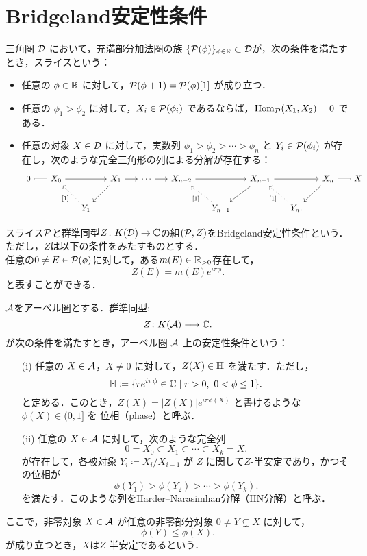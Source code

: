 \section{Bridgeland安定性条件}
\begin{defn}\cite{Bri07}
三角圏 $\D$ において，充満部分加法圏の族 $\{ \P(\phi) \}_{\phi \in \RR} \subset \D$が，次の条件を満たすとき，スライスという：
\begin{itemize}
  \item 任意の $\phi \in \RR$ に対して，$\P(\phi + 1) = \P(\phi)[1]$ が成り立つ．
  \item 任意の $\phi_1 > \phi_2$ に対して，$X_i \in \P(\phi_i)$ であるならば，$\Hom_{\D}(X_1, X_2) = 0$ である．
  \item 任意の対象 $X \in \D$ に対して，実数列 $\phi_1 > \phi_2 > \cdots > \phi_n$ と $Y_i \in \P(\phi_i)$ が存在し，次のような完全三角形の列による分解が存在する：
  \[
    \begin{tikzcd}[column sep=1.5em]
      0 \ar[r, equal] & X_0 \ar[rr] && X_1 \ar[r] \ar[ld] & \cdots \ar[r] & X_{n-2} \ar[rr] && X_{n-1} \ar[ld] \ar[rr] && X_n \ar[ld] \ar[r, equal] & X \\
      && Y_1 \ar[lu, dotted,swap, "{[1]}"'] &&&& Y_{n-1} \ar[lu, dotted,swap, "{[1]}"'] && Y_n \ar[lu, dotted,swap, "{[1]}"'].
    \end{tikzcd}
  \]
\end{itemize}
スライス$\P$と群準同型$Z\colon K(\D)\to \CC$の組$(\P,Z)$をBridgeland安定性条件という．ただし，$Z$は以下の条件をみたすものとする．\\
任意の$0\neq E\in\P(\phi)$に対して，ある$m(E)\in\RR_{>0}$存在して，
\[Z(E) = m(E)e^{i\pi\phi}.\]
と表すことができる．
\end{defn}


\begin{defn}\cite{Bri07}
$\A$をアーベル圏とする．群準同型:
\[
  Z \colon K(\A) \longrightarrow \CC.
\]
が次の条件を満たすとき，アーベル圏 $\A$ 上の安定性条件という：
\begin{itemize}
  \item[(i)] 任意の $X \in \A$，$X \neq 0$ に対して，$Z(X) \in \HH$ を満たす．ただし，
  \[
    \HH \coloneqq \{ re^{i\pi\phi} \in \CC \mid r > 0,\ 0 < \phi \le 1 \}.
  \]
  と定める．このとき，$Z(X) = |Z(X)|e^{i\pi\phi(X)}$ と書けるような $\phi(X) \in (0,1]$ を
  位相（phase）と呼ぶ．
  
  \item[(ii)] 任意の $X \in \A$ に対して，次のような完全列
  \[
    0 = X_0 \subset X_1 \subset \cdots \subset X_k = X.
  \]
  が存在して，各被対象 $Y_i \coloneqq X_i / X_{i-1}$ が $Z$ に関して$Z$-半安定であり，かつその位相が
  \[
    \phi(Y_1) > \phi(Y_2) > \cdots > \phi(Y_k).
  \]
  を満たす．このような列をHarder--Narasimhan分解（HN分解）と呼ぶ．
\end{itemize}

ここで，非零対象 $X \in \A$ が任意の非零部分対象 $0 \neq Y \subsetneq X$ に対して，
\[
   \phi(Y) \le  \phi(X).
\]
が成り立つとき，$X$は$Z$-半安定であるという．
\end{defn}

